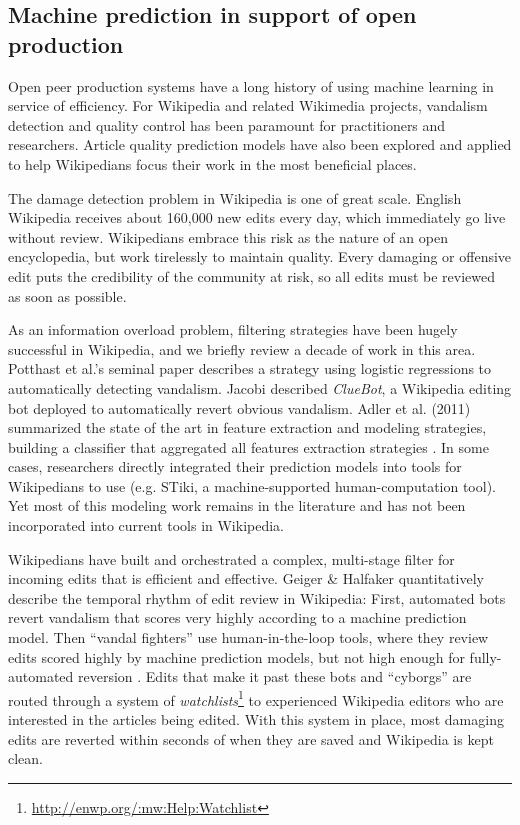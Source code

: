\subsection{Machine prediction in support of open production}
Open peer production systems have a long history of using machine learning in service of efficiency. For Wikipedia and related Wikimedia projects, vandalism detection and quality control has been paramount for practitioners and researchers.  Article quality prediction models have also been explored and applied to help Wikipedians focus their work in the most beneficial places.

 The damage detection problem in Wikipedia is one of great scale.  English Wikipedia receives about 160,000 new edits every day, which immediately go live without review.  Wikipedians embrace this risk as the nature of an open encyclopedia, but work tirelessly to maintain quality. Every damaging or offensive edit puts the credibility of the community at risk, so all edits must be reviewed as soon as possible.

As an information overload problem, filtering strategies have been hugely successful in Wikipedia, and we briefly review a decade of work in this area. Potthast et al.'s seminal paper\cite{potthast2008automatic} describes a strategy using logistic regressions to automatically detecting vandalism. Jacobi described \emph{ClueBot}\cite{carter2008cluebot}, a Wikipedia editing bot deployed to automatically revert obvious vandalism. Adler et al. (2011) summarized the state of the art in feature extraction and modeling strategies, building a classifier that aggregated all features extraction strategies \cite{adler2011wikipedia}.  In some cases, researchers directly integrated their prediction models into tools for Wikipedians to use (e.g. STiki\cite{west2010stiki}, a machine-supported human-computation tool). Yet most of this modeling work remains in the literature and has not been incorporated into current tools in Wikipedia.

Wikipedians have built and orchestrated a complex, multi-stage filter for incoming edits that is efficient and effective.  Geiger \& Halfaker quantitatively describe the temporal rhythm of edit review in Wikipedia\cite{geiger2013levee}: First, automated bots revert vandalism that scores very highly according to a machine prediction model. Then ``vandal fighters'' use human-in-the-loop tools, where they review edits scored highly by machine prediction models, but not high enough for fully-automated reversion \cite{geiger2010work}.  Edits that make it past these bots and ``cyborgs''\cite{halfaker2012bots} are routed through a system of \emph{watchlists}\footnote{\url{http://enwp.org/:mw:Help:Watchlist}} to experienced Wikipedia editors who are interested in the articles being edited.  With this system in place, most damaging edits are reverted within seconds of when they are saved\cite{geiger2013levee} and Wikipedia is kept clean.

